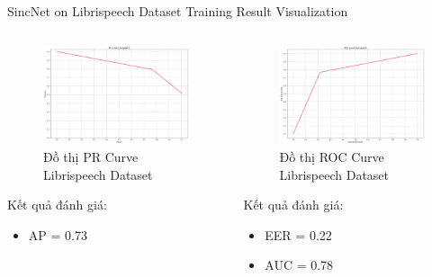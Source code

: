 \documentclass[notheorems, aspectratio=54]{beamer}
\begin{document}
\begin{frame}{SincNet on Librispeech Dataset Training Result Visualization}
	\begin{columns}
		\begin{column}{0.47\textwidth}
			\begin{figure}[H]
				\includegraphics[width=0.9\linewidth]{result/pr_curve_librispeech.png}
				\caption{Đồ thị PR Curve Librispeech Dataset}
			\end{figure}
		Kết quả đánh giá:
		\begin{itemize}
			\item AP = 0.73
		\end{itemize}
		\end{column}
		\begin{column}{0.5\textwidth}
			\begin{figure}[H]
				\includegraphics[width=0.9\linewidth]{result/roc_curve_librispeech.png}
				\caption{Đồ thị ROC Curve Librispeech Dataset}
			\end{figure}
		Kết quả đánh giá:
		\begin{itemize}
			\item EER = 0.22
			\item AUC = 0.78
		\end{itemize}
		\end{column}
	\end{columns}
\end{frame}
\end{document}
